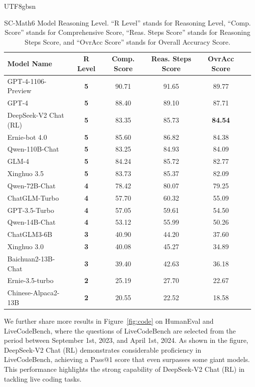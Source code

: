 \documentclass[11pt, a4paper, logo, copyright, nonumbering]{deepseek}
\newcommand{\dsviirl}{DeepSeek-V2 Chat (RL)}
\begin{document}
\begin{CJK*}{UTF8}{gbsn}
\begin{table}[!ht]
    \centering
    \begin{tabular}{lccccc}
    \toprule
    \centering
    \textbf{Model Name} & \textbf{R Level} & \textbf{Comp. Score} & \textbf{Reas. Steps Score} & \textbf{OvrAcc Score} \\
    \midrule
    GPT-4-1106-Preview & \textbf{5} & 90.71 & 91.65 & 89.77 \\
    GPT-4 & \textbf{5} & 88.40 & 89.10 & 87.71 \\ \midrule
    \dsviirl{} & \textbf{5} & 83.35 & 85.73 & \textbf{84.54} \\
    Ernie-bot 4.0 & \textbf{5} & 85.60 & 86.82 & 84.38 \\
    Qwen-110B-Chat & \textbf{5} & 83.25 & 84.93 & 84.09 \\
    GLM-4 & \textbf{5} & 84.24 & 85.72 & 82.77 \\
    Xinghuo 3.5 & \textbf{5} & 83.73 & 85.37 & 82.09 \\
    Qwen-72B-Chat & \textbf{4} &78.42 & 80.07 & 79.25 \\
    ChatGLM-Turbo & \textbf{4} & 57.70 & 60.32 & 55.09 \\
    GPT-3.5-Turbo & \textbf{4} & 57.05 & 59.61 & 54.50 \\
    Qwen-14B-Chat & \textbf{4} & 53.12 & 55.99 & 50.26 \\
    ChatGLM3-6B & \textbf{3} & 40.90 & 44.20 & 37.60 \\
    Xinghuo 3.0 & \textbf{3} & 40.08 & 45.27 & 34.89 \\
    Baichuan2-13B-Chat & \textbf{3} & 39.40 & 42.63 & 36.18 \\
    Ernie-3.5-turbo & \textbf{2} & 25.19 & 27.70 & 22.67 \\
    Chinese-Alpaca2-13B & \textbf{2} & 20.55 & 22.52 & 18.58 \\
    \bottomrule
    \end{tabular}
    \caption{
    SC-Math6 Model Reasoning Level. 
    ``R Level'' stands for Reasoning Level, 
    ``Comp. Score'' stands for Comprehensive Score, 
    ``Reas. Steps Score'' stands for Reasoning Steps Score, 
    and ``OvrAcc Score'' stands for Overall Accuracy Score.
    }
    \label{tab:model_overall}
\end{table}

We further share more results in Figure~\ref{fig:code} on HumanEval and LiveCodeBench, where the questions of LiveCodeBench are selected from the period between September 1st, 2023, and April 1st, 2024.
As shown in the figure, \dsviirl{} demonstrates considerable proficiency in LiveCodeBench, achieving a Pass@1 score that even surpasses some giant models. 
This performance highlights the strong capability of \dsviirl{} in tackling live coding tasks. 


\end{CJK*}
\end{document}
